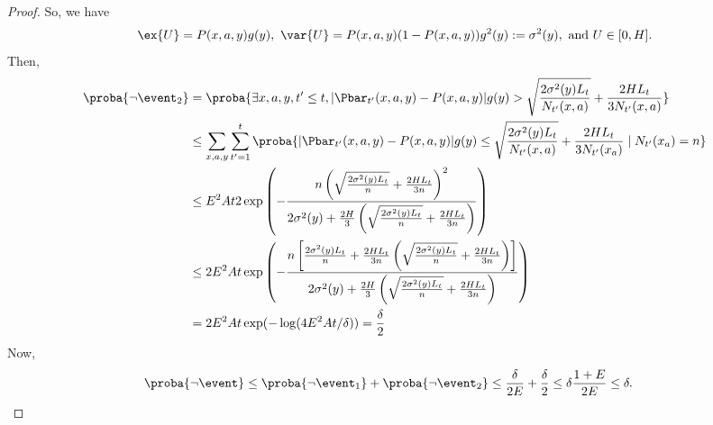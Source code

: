 \begin{proof}
    So, we have
    \begin{align*}
    \ex{U}=P(x,a,y)g(y),\ \var{U}=P(x,a,y)(1-P(x,a,y))g^2(y):=\sigma^2(y), \text{ and } U\in[0,H].
    \end{align*}
    Then,
    \begin{align*}
    \proba{\neg\event_2}
    &=\proba{\exists x,a,y,t'\le t,|\Pbar_{t'}(x,a,y)-P(x,a,y)|g(y) >\sqrt{\frac{2\sigma^2(y)L_t}{N_{t'}(x,a)}} +\frac{2HL_t}{3N_{t'}(x,a)}} \\
    &\le\sum_{x,a,y} \sum_{t'=1}^{t} \proba{|\Pbar_{t'}(x,a,y)-P(x,a,y)|g(y) \le\sqrt{\frac{2\sigma^2(y)L_t}{N_{t'}(x,a)}} +\frac{2HL_t}{3N_{t'}(x_a)}\mid N_{t'}(x_a)=n} \\
    &\le E^2At 2\exp\left(-\frac{n\left(\sqrt{\frac{2\sigma^2(y)L_t}{n}} +\frac{2HL_t}{3n}\right)^2}{2\sigma^2(y)+\frac{2H}{3}\left(\sqrt{\frac{2\sigma^2(y)L_t}{n}} +\frac{2HL_t}{3n}\right)}\right) \\
    &\le 2E^2At\exp\left(-\frac{n\left[\frac{2\sigma^2(y)L_t}{n} +\frac{2HL_t}{3n}\left(\sqrt{\frac{2\sigma^2(y)L_t}{n}} +\frac{2HL_t}{3n}\right)\right]}{2\sigma^2(y)+\frac{2H}{3}\left(\sqrt{\frac{2\sigma^2(y)L_t}{n}} +\frac{2HL_t}{3n}\right)}\right) \\
    &=2E^2At\exp(-\log(4E^2At/\delta)) = \frac{\delta}2
    \end{align*}
    Now,
    \begin{align*}
    \proba{\neg\event} 
    &\le\proba{\neg\event_1} +\proba{\neg\event_2}\le\frac{\delta}{2E} +\frac{\delta}2\le \delta\frac{1+E}{2E} \le \delta.
    \end{align*}
    \end{proof}
    
